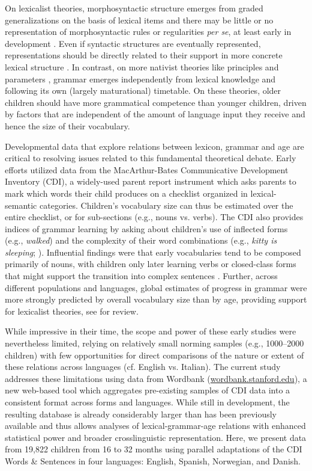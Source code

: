 \documentclass[10pt,letterpaper]{article}
\begin{document}
On lexicalist theories, morphosyntactic structure emerges from graded generalizations on the basis of lexical items and there may be little or no representation of morphosyntactic rules or regularities \emph{per se}, at least early in development \cite{tomasello2003}. Even if syntactic structures are eventually represented, representations should be directly related to their support in more concrete lexical structure \cite{bannard2009}. In contrast, on more nativist theories like principles and parameters \cite{chomsky1981, baker2005}, grammar emerges independently from lexical knowledge and following its own (largely maturational) timetable. On these theories, older children should have more grammatical competence than younger children, driven by factors that are independent of the amount of language input they receive and hence the size of their vocabulary.

Developmental data that explore relations between lexicon, grammar and age are critical to resolving issues related to this fundamental theoretical debate.  Early efforts utilized data from the MacArthur-Bates Communicative Development Inventory (CDI), a widely-used parent report instrument which asks parents to mark which words their child produces on a checklist organized in lexical-semantic categories. Children's vocabulary size can thus be estimated over the entire checklist, or for sub-sections (e.g., nouns vs. verbs). The CDI also provides indices of grammar learning by asking about children's use of inflected forms (e.g., \emph{walked}) and the complexity of their word combinations (e.g., \emph{kitty is sleeping}; ).  Influential findings were that early vocabularies tend to be composed primarily of nouns, with children only later learning verbs or closed-class forms that might support the transition into complex sentences \cite{bates1994}. Further, across different populations and languages, global estimates of progress in grammar were more strongly predicted by overall vocabulary size than by age, providing support for lexicalist theories, see \cite{bates1999} for review. 


While impressive in their time, the scope and power of these early studies were nevertheless limited, relying on relatively small norming samples (e.g., 1000--2000 children) with few opportunities for direct comparisons of the nature or extent of these relations across languages (cf. English vs. Italian). The current study addresses these limitations using data from Wordbank (\url{wordbank.stanford.edu}), a new web-based tool which aggregates pre-existing samples of CDI data into a consistent format across forms and languages. While still in development, the resulting database is already considerably larger than has been previously available and thus allows analyses of lexical-grammar-age relations with enhanced statistical power and broader crosslinguistic representation. Here, we present data from 19,822 children from 16 to 32 months using parallel adaptations of the CDI Words \& Sentences in four languages: English, Spanish, Norwegian, and Danish.
\end{document}
